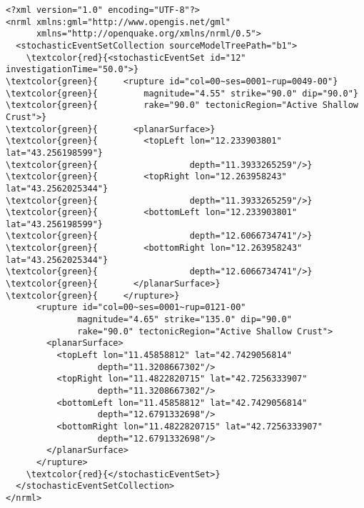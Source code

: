 \begin{Verbatim}[frame=single, commandchars=\\\{\}, fontsize=\small]
<?xml version="1.0" encoding="UTF-8"?>
<nrml xmlns:gml="http://www.opengis.net/gml"
	  xmlns="http://openquake.org/xmlns/nrml/0.5">
  <stochasticEventSetCollection sourceModelTreePath="b1">
    \textcolor{red}{<stochasticEventSet id="12" investigationTime="50.0">}
\textcolor{green}{     <rupture id="col=00~ses=0001~rup=0049-00"}
\textcolor{green}{         magnitude="4.55" strike="90.0" dip="90.0"}
\textcolor{green}{         rake="90.0" tectonicRegion="Active Shallow Crust">}
\textcolor{green}{       <planarSurface>}
\textcolor{green}{         <topLeft lon="12.233903801" lat="43.256198599"}
\textcolor{green}{                  depth="11.3933265259"/>}
\textcolor{green}{         <topRight lon="12.263958243" lat="43.2562025344"}
\textcolor{green}{                  depth="11.3933265259"/>}
\textcolor{green}{         <bottomLeft lon="12.233903801" lat="43.256198599"}
\textcolor{green}{                  depth="12.6066734741"/>}
\textcolor{green}{         <bottomRight lon="12.263958243" lat="43.2562025344"}
\textcolor{green}{                  depth="12.6066734741"/>}
\textcolor{green}{       </planarSurface>}
\textcolor{green}{     </rupture>}
      <rupture id="col=00~ses=0001~rup=0121-00"
              magnitude="4.65" strike="135.0" dip="90.0"
              rake="90.0" tectonicRegion="Active Shallow Crust">
        <planarSurface>
          <topLeft lon="11.45858812" lat="42.7429056814"
                  depth="11.3208667302"/>
          <topRight lon="11.4822820715" lat="42.7256333907"
                  depth="11.3208667302"/>
          <bottomLeft lon="11.45858812" lat="42.7429056814"
                  depth="12.6791332698"/>
          <bottomRight lon="11.4822820715" lat="42.7256333907"
                  depth="12.6791332698"/>
        </planarSurface>
      </rupture>
    \textcolor{red}{</stochasticEventSet>}
  </stochasticEventSetCollection>
</nrml>
\end{Verbatim}
